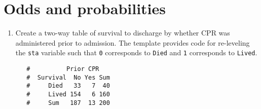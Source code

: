 \documentclass[letterpaper,12pt,twoside,]{pinp}
\begin{document}
\newpage

\hypertarget{odds-and-probabilities}{%
\section{Odds and probabilities}\label{odds-and-probabilities}}

\begin{enumerate}
\def\labelenumi{\arabic{enumi}.}
\item
  Create a two-way table of survival to discharge by whether CPR was
  administered prior to admission. The template provides code for
  re-leveling the \texttt{sta} variable such that \texttt{0} corresponds
  to \texttt{Died} and \texttt{1} corresponds to \texttt{Lived}.

\begin{Shaded}
\begin{Highlighting}[]
\NormalTok{(}\NormalTok{)}
\end{Highlighting}
\end{Shaded}

\begin{Shaded}
\begin{Highlighting}[]
\NormalTok{(}\NormalTok{)}

\SpecialCharTok{$}\OtherTok{=} \SpecialCharTok{$} \NormalTok{(}\SpecialCharTok{$}

\NormalTok{(}\SpecialCharTok{$}\SpecialCharTok{$}
              \NormalTok{(}\NormalTok{, }\NormalTok{)))}
\end{Highlighting}
\end{Shaded}

  \begin{ShadedResult}
   \begin{verbatim}
   #          Prior CPR
   #  Survival  No Yes Sum
   #     Died   33   7  40
   #     Lived 154   6 160
   #     Sum   187  13 200
   \end{verbatim}
   \end{ShadedResult}


\end{enumerate}
\end{document}
